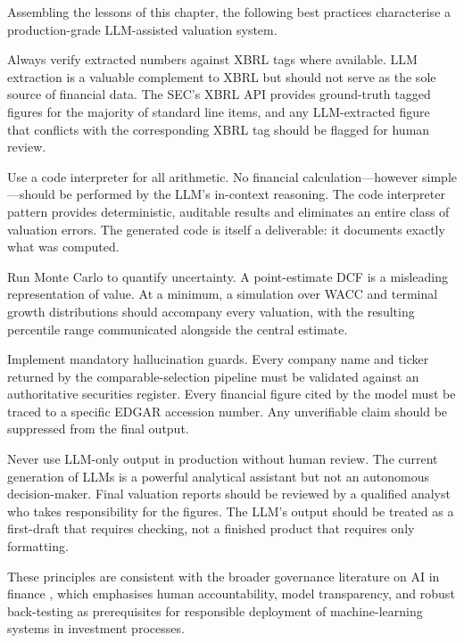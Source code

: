 \begin{deepdive}
Assembling the lessons of this chapter, the following best practices characterise a
production-grade LLM-assisted valuation system.

Always verify extracted numbers against XBRL tags where available. LLM extraction
is a valuable complement to XBRL but should not serve as the sole source of
financial data. The SEC's XBRL API provides ground-truth tagged figures for the
majority of standard line items, and any LLM-extracted figure that conflicts with
the corresponding XBRL tag should be flagged for human review.

Use a code interpreter for all arithmetic. No financial calculation---however
simple---should be performed by the LLM's in-context reasoning. The code interpreter
pattern provides deterministic, auditable results and eliminates an entire class
of valuation errors. The generated code is itself a deliverable: it documents exactly
what was computed.

Run Monte Carlo to quantify uncertainty. A point-estimate DCF is a misleading
representation of value. At a minimum, a simulation over WACC and terminal growth
distributions should accompany every valuation, with the resulting percentile range
communicated alongside the central estimate.

Implement mandatory hallucination guards. Every company name and ticker returned by
the comparable-selection pipeline must be validated against an authoritative
securities register. Every financial figure cited by the model must be traced to a
specific EDGAR accession number. Any unverifiable claim should be suppressed from
the final output.

Never use LLM-only output in production without human review. The current generation
of LLMs is a powerful analytical assistant but not an autonomous decision-maker.
Final valuation reports should be reviewed by a qualified analyst who takes
responsibility for the figures. The LLM's output should be treated as a first-draft
that requires checking, not a finished product that requires only formatting.

These principles are consistent with the broader governance literature on AI in
finance \cite{fsb2023ai},
which emphasises human accountability, model transparency, and robust back-testing
as prerequisites for responsible deployment of machine-learning systems in investment
processes.
\end{deepdive}


